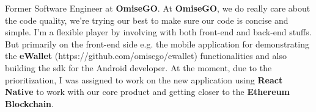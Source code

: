 

\begin{cvparagraph}

Former Software Engineer at \textbf{OmiseGO}. At \textbf{OmiseGO}, we do really care about the code quality, we're trying our best to make sure our code is concise and simple. I'm a flexible player by involving with both front-end and back-end stuffs. But primarily on the front-end side e.g. the mobile application for demonstrating the \textbf{eWallet} (https://github.com/omisego/ewallet) functionalities and also building the sdk for the Android developer. At the moment, due to the prioritization, I was assigned to work on the new application using \textbf{React Native} to work with our core product and getting closer to the \textbf{Ethereum Blockchain}. 

\end{cvparagraph}
